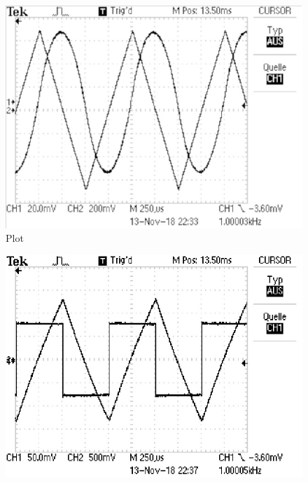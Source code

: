 \begin{figure}
  \centering
  \includegraphics{build/integrator2.pdf}
  \caption{Plot}
  \label{fig:plot}
\end{figure}

\begin{figure}
  \centering
  \includegraphics{build/integrator3.pdf}
  \label{fig:plot}
\end{figure}
